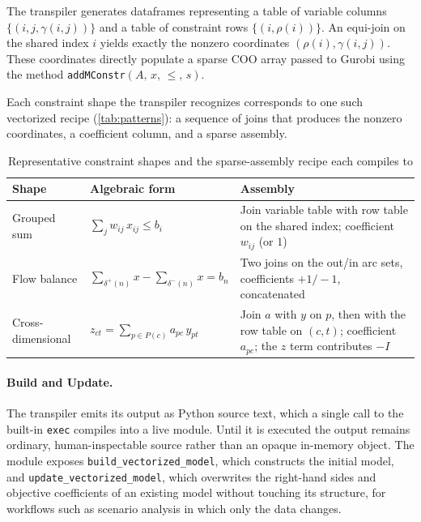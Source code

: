 \documentclass[runningheads]{llncs}
\begin{document}
The transpiler generates dataframes representing a table of variable columns $\{(i,j,\gamma(i,j))\}$ and a table of constraint rows $\{(i,\rho(i))\}$. An equi-join on the shared index $i$ yields exactly the nonzero coordinates $(\rho(i),\gamma(i,j))$. These coordinates directly populate a sparse COO array passed to Gurobi using the method \texttt{addMConstr}$(A,\,x,\,{\le},\,s)$.

Each constraint shape the transpiler recognizes corresponds to one such vectorized recipe (\autoref{tab:patterns}): a sequence of joins that produces the nonzero coordinates, a coefficient column, and a sparse assembly.

\begin{table}[tb]
\centering
\caption{Representative constraint shapes and the sparse-assembly recipe each compiles to}
\label{tab:patterns}
\footnotesize
\begin{tabular}{@{}p{}p{}p{}@{}}
\toprule
\textbf{Shape} & \textbf{Algebraic form} & \textbf{Assembly} \\
\midrule
Grouped sum & $\sum_{j} w_{ij}\,x_{ij} \le b_i$ & Join variable table with row table on the shared index; coefficient $w_{ij}$ (or $1$) \\
Flow balance & $\sum_{\delta^+(n)} x - \sum_{\delta^-(n)} x = b_n$ & Two joins on the out/in arc sets, coefficients $+1/-1$, concatenated \\
Cross-dimensional & $z_{ct} = \sum_{p\in P(c)} a_{pc}\,y_{pt}$ & Join $a$ with $y$ on $p$, then with the row table on $(c,t)$; coefficient $a_{pc}$; the $z$ term contributes $-I$ \\
\bottomrule
\end{tabular}
\end{table}

\paragraph{Build and Update.} The transpiler emits its output as Python source text, which a single call to the built-in \texttt{exec} compiles into a live module. Until it is executed the output remains ordinary, human-inspectable source rather than an opaque in-memory object. The module exposes \texttt{build\_vectorized\_model}, which constructs the initial model, and \texttt{update\_vectorized\_model}, which overwrites the right-hand sides and objective coefficients of an existing model without touching its structure, for workflows such as scenario analysis in which only the data changes.
\end{document}
